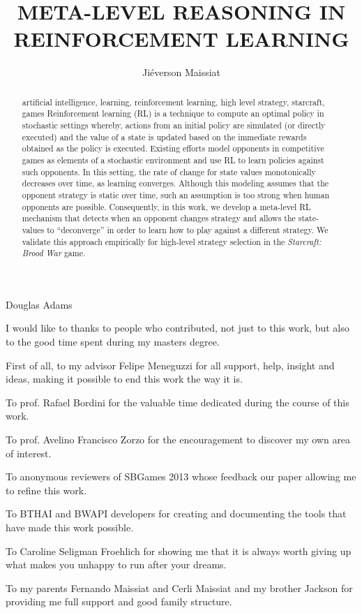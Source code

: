 \documentclass[english,twoside]{pucrs-ppgcc}
\author{Jiéverson Maissiat}
\title{META-LEVEL REASONING IN REINFORCEMENT LEARNING}
      {META-LEVEL REASONING IN REINFORCEMENT LEARNING}
\begin{document}
 


 {Douglas Adams}

\begin{agradecimentos}

I would like to thanks to people who contributed, not just to this work, but also to the good time spent during my masters degree.

First of all, to my advisor Felipe Meneguzzi for all support, help, insight and ideas, making it possible to end this work the way it is.

To prof. Rafael Bordini for the valuable time dedicated during the course of this work.

To prof. Avelino Francisco Zorzo for the encouragement to discover my own area of interest.

To anonymous reviewers of SBGames 2013 whose feedback our paper allowing me to refine this work. 

To BTHAI and BWAPI developers for creating and documenting the tools that have made this work possible.

To Caroline Seligman Froehlich for showing me that it is always worth giving up what makes you unhappy to run after your dreams.

To my parents Fernando Maissiat and Cerli Maissiat and my brother Jackson for providing me full support and good family structure.

\end{agradecimentos}

\begin{abstract}{artificial intelligence, learning, reinforcement learning, high level strategy, starcraft, games}
Reinforcement learning (RL) is a technique to compute an optimal policy in stochastic settings whereby, actions from an initial policy are simulated (or directly executed) and the value of a state is updated based on the immediate rewards obtained as the policy is executed. 
Existing efforts model opponents in competitive games as elements of a stochastic environment and use RL to learn policies against such opponents. 
In this setting, the rate of change for state values monotonically decreases over time, as learning converges. 
Although this modeling assumes that the opponent strategy is static over time, such an assumption is too strong when human opponents are possible. 
Consequently, in this work, we develop a meta-level RL mechanism that detects when an opponent changes strategy and allows the state-values to ``deconverge'' in order to learn how to play against a different strategy. 
We validate this approach empirically for high-level strategy selection in the \textit{Starcraft: Brood War} game.
\end{abstract}
\end{document}
